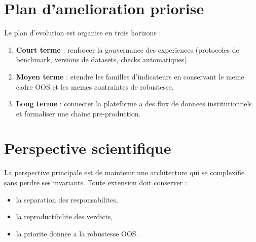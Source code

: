 \section{Plan d'amelioration priorise}
Le plan d'evolution est organise en trois horizons :
\begin{enumerate}
\item \textbf{Court terme} : renforcer la gouvernance des experiences
(protocoles de benchmark, versions de datasets, checks automatiques).
\item \textbf{Moyen terme} : etendre les familles d'indicateurs en conservant le
meme cadre OOS et les memes contraintes de robustesse.
\item \textbf{Long terme} : connecter la plateforme a des flux de donnees
institutionnels et formaliser une chaine pre-production.
\end{enumerate}

\section{Perspective scientifique}
La perspective principale est de maintenir une architecture qui se complexifie
sans perdre ses invariants. Toute extension doit conserver :
\begin{itemize}
\item la separation des responsabilites,
\item la reproductibilite des verdicts,
\item la priorite donnee a la robustesse OOS.
\end{itemize}

